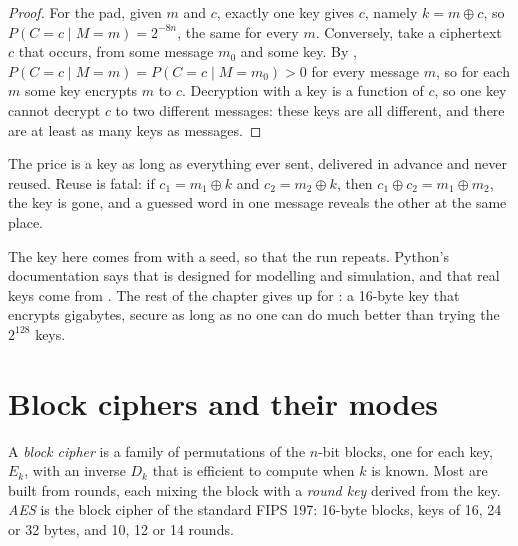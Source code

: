\begin{proof}
For the pad, given $m$ and $c$, exactly one key gives $c$, namely $k = m \oplus c$, so $P(C = c \mid M = m) = 2^{-8n}$, the same for every $m$. Conversely, take a ciphertext $c$ that occurs, from some message $m_0$ and some key. By , $P(C = c \mid M = m) = P(C = c \mid M = m_0) > 0$ for every message $m$, so for each $m$ some key encrypts $m$ to $c$. Decryption with a key is a function of $c$, so one key cannot decrypt $c$ to two different messages: these keys are all different, and there are at least as many keys as messages.
\end{proof}

The price is a key as long as everything ever sent, delivered in advance and never reused. Reuse is fatal: if $c_1 = m_1 \oplus k$ and $c_2 = m_2 \oplus k$, then $c_1 \oplus c_2 = m_1 \oplus m_2$, the key is gone, and a guessed word in one message reveals the other at the same place.

\label{lst:b3:symmetric-cryptography:otp}

\label{out:b3:symmetric-cryptography:otp}

The key here comes from  with a seed, so that the run repeats. Python's documentation says that  is designed for modelling and simulation, and that real keys come from . %
The rest of the chapter gives up  for : a 16-byte key that encrypts gigabytes, secure as long as no one can do much better than trying the $2^{128}$ keys.

\section{Block ciphers and their modes}\label{sec:b3:symmetric-cryptography:block}

\begin{definition}\label{def:b3:symmetric-cryptography:block}
A \emph{block cipher} is a family of permutations of the $n$-bit blocks, one for each key, $E_k$, with an inverse $D_k$ that is efficient to compute when $k$ is known. Most are built from rounds, each mixing the block with a \emph{round key} derived from the key. \emph{AES} is the block cipher of the standard FIPS 197: 16-byte blocks, keys of 16, 24 or 32 bytes, and 10, 12 or 14 rounds.
\end{definition}

